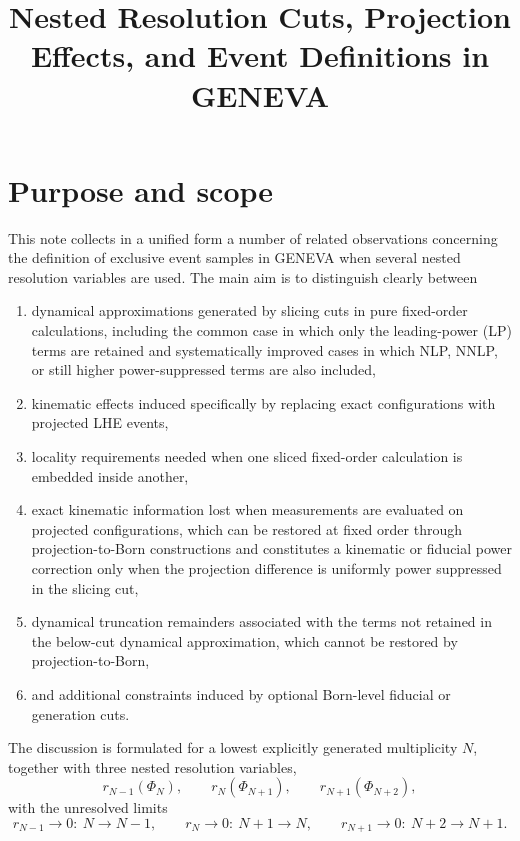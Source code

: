 \documentclass[11pt]{article}
\title{Nested Resolution Cuts, Projection Effects, and Event Definitions in GENEVA}
\author{}
\date{}
\newcommand{\rnm}{r_{N-1}}
\newcommand{\rn}{r_N}
\newcommand{\rnp}{r_{N+1}}
\newcommand{\Ph}{\Phi}
\begin{document}
\maketitle

\renewcommand{\contentsname}{Outline}
\setcounter{tocdepth}{2}
\tableofcontents
\clearpage

\section{Purpose and scope}

This note collects in a unified form a number of related observations concerning the definition of
exclusive event samples in GENEVA when several nested resolution variables are used.
The main aim is to distinguish clearly between
\begin{enumerate}[label=(\roman*)]
\item dynamical approximations generated by slicing cuts in pure fixed-order calculations, including the common case in which only the leading-power (LP) terms are retained and systematically improved cases in which NLP, NNLP, or still higher power-suppressed terms are also included,
\item kinematic effects induced specifically by replacing exact configurations with projected LHE events,
\item locality requirements needed when one sliced fixed-order calculation is embedded inside another,
\item exact kinematic information lost when measurements are evaluated on projected configurations, which can
be restored at fixed order through projection-to-Born constructions and constitutes a kinematic or fiducial
power correction only when the projection difference is uniformly power suppressed in the slicing cut,
\item dynamical truncation remainders associated with the terms not retained in the below-cut dynamical approximation, which cannot be restored by projection-to-Born,
\item and additional constraints induced by optional Born-level fiducial or generation cuts.
\end{enumerate}

The discussion is formulated for a lowest explicitly generated multiplicity \(N\), together with three
nested resolution variables,
\begin{equation}
\rnm(\Ph_N),\qquad
\rn(\Ph_{N+1}),\qquad
\rnp(\Ph_{N+2}),
\label{eq:nested-variables}
\end{equation}
with the unresolved limits
\begin{equation}
\rnm\to0:\ N\to N-1,\qquad
\rn\to0:\ N+1\to N,\qquad
\rnp\to0:\ N+2\to N+1.
\label{eq:unresolved-limits}
\end{equation}
\end{document}

